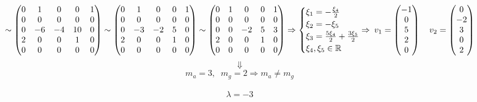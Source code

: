 \documentclass{article}
\newcommand{\la}{\lambda}
\newcommand{\shiftleft}[3]{\makebox[#1][r]{\makebox[#2][l]{#3}}}
\begin{document}
$$\sim \begin{pmatrix}
0 & 1 & 0 & 0 & 1 \\
0 & 0 & 0 & 0 & 0 \\
0 & -6 & -4 & 10 & 0 \\
2 & 0 & 0 & 1 & 0 \\
0 & 0 & 0 & 0 & 0
\end{pmatrix}\sim \begin{pmatrix}
0 & 1 & 0 & 0 & 1 \\
0 & 0 & 0 & 0 & 0 \\
0 & -3 & -2 & 5 & 0 \\
2 & 0 & 0 & 1 & 0 \\
0 & 0 & 0 & 0 & 0
\end{pmatrix} \sim \begin{pmatrix}
0 & 1 & 0 & 0 & 1 \\
0 & 0 & 0 & 0 & 0 \\
0 & 0 & -2 & 5 & 3 \\
2 & 0 & 0 & 1 & 0 \\
0 & 0 & 0 & 0 & 0
\end{pmatrix} \Rightarrow \begin{cases}
\xi_1 = -\frac{\xi_4}{2} \\
\xi_2 = -\xi_5 \\
\xi_3 = \frac{5\xi_4}{2} + \frac{3\xi_5}{2} \\
\xi_4, \xi_5\in \mathbb{R}
\end{cases} \shiftleft{5pt}{15pt}{$\Rightarrow$} v_1 = \begin{pmatrix}
-1 \\ 0 \\ 5 \\ 2 \\ 0
\end{pmatrix} \quad v_2 = \begin{pmatrix}
0 \\ -2 \\ 3 \\ 0 \\ 2
\end{pmatrix}$$ 
$$\Downarrow$$
$$m_a = 3,\;\;m_g = 2 \Rightarrow m_a\neq m_g$$\\
$$\la = -3$$
\end{document}
